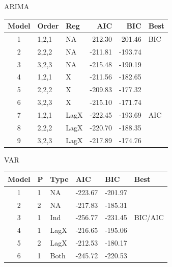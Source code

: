\documentclass[ignorenonframetext]{beamer}
\begin{document}
  	\begin{frame}{ARIMA}
  		\begin{table}[htb]
\centering
\begin{tabular}{cllrrl}
  \hline
 Model & Order & Reg  & AIC & BIC & Best \\ 
  \hline
1 & 1,2,1 &  NA &   -212.30 & -201.46 & BIC \\ 
  2  & 2,2,2 & NA   & -211.81 & -193.74 &  \\ 
  3  & 3,2,3 &  NA  & -215.48 & -190.19 &  \\ 
  4  & 1,2,1 & X  & -211.56 & -182.65 &  \\ 
  5  & 2,2,2 & X   & -209.83 & -177.32 &  \\ 
  6  & 3,2,3 & X   & -215.10 & -171.74 &  \\ 
  7  & 1,2,1 &  LagX & -222.45 & -193.69 & AIC \\ 
  8  & 2,2,2 &  LagX & -220.70 & -188.35 &  \\ 
  9  & 3,2,3 &  LagX & -217.89 & -174.76 &  \\ 
   \hline
\end{tabular}
\end{table}
  	\end{frame}
 
  	\begin{frame}{VAR}
 \begin{table}[htb]
\centering
\begin{tabular}{clllll}
  \hline
 Model & P & Type &  AIC & BIC & Best \\ 
  \hline
1  & 1 & NA  &  -223.67 & -201.97 &  \\ 
  2  & 2 & NA  &   -217.83 & -185.31 &  \\ 
  3  & 1 & Ind  & -256.77 & -231.45 & BIC/AIC \\ 
  4  & 1 & LagX & -216.65 & -195.06 &  \\ 
  5  & 2 & LagX & -212.53 & -180.17 &  \\ 
  6  & 1 & Both  & -245.72 & -220.53 &  \\ 
   \hline
\end{tabular}
\end{table}
  	\end{frame}
 
\end{document}
